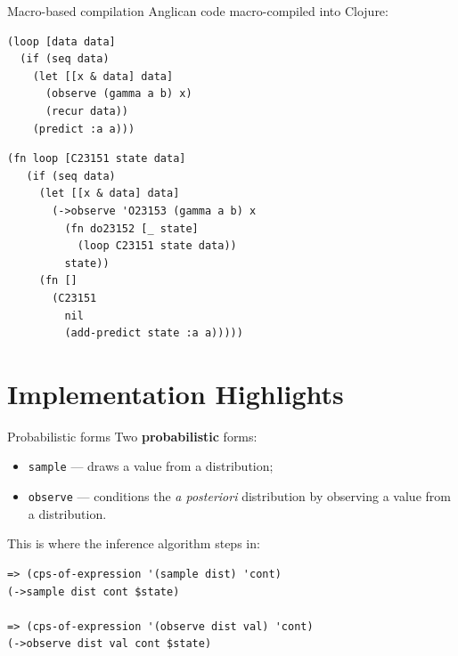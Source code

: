 \documentclass{beamer}
\begin{document}
\begin{frame}[fragile]{Macro-based compilation}
    Anglican code macro-compiled into Clojure:
    \begin{minipage}{0.48\textwidth}
\begin{verbatim}
(loop [data data]
  (if (seq data)
    (let [[x & data] data]
      (observe (gamma a b) x)
      (recur data))
    (predict :a a)))
\end{verbatim}
    \end{minipage}
    \begin{minipage}{0.44\textwidth}
    \vspace{2em}
\begin{verbatim}
(fn loop [C23151 state data]
   (if (seq data)
     (let [[x & data] data]
       (->observe 'O23153 (gamma a b) x
         (fn do23152 [_ state]
           (loop C23151 state data))
         state))
     (fn []
       (C23151
         nil
         (add-predict state :a a)))))
\end{verbatim}
    \end{minipage}
\end{frame}

\section{Implementation Highlights}

\begin{frame}[fragile]{Probabilistic forms}
    Two \textbf{probabilistic} forms:
    \begin{itemize}
        \item \texttt{sample} --- draws a value from a
            distribution;
        \item \texttt{observe} --- conditions the \textit{a
            posteriori} distribution by observing a value from a
            distribution.
    \end{itemize}
    \bigskip
    This is where the inference algorithm steps in:
\begin{verbatim}
=> (cps-of-expression '(sample dist) 'cont)
(->sample dist cont $state)

=> (cps-of-expression '(observe dist val) 'cont)
(->observe dist val cont $state)
\end{verbatim}
\end{frame}
\end{document}
